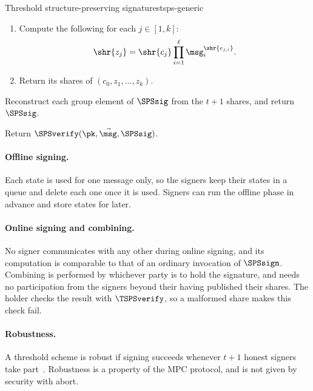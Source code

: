\begin{protocolbox}{Threshold structure-preserving signatures}{tsps-generic}
\begin{description}
      \begin{enumerate}

	\item Compute the following for each $j \in [1,k]$:
	  \begin{equation*}
	    \shr{z_j} = \shr{c_j} \prod_{i=1}^{\ell} \msg_i^{\shr{e_{j,i}}}.
	  \end{equation*}

	\item Return its shares of $(c_0, z_1, \ldots, z_k)$.

      \end{enumerate}

    \item[$\SPSsig \leftarrow \TSPScombine(\{\SPSsig_h\}_{h \in Q})$ :]
Reconstruct each group element of $\SPSsig$ from the $t+1$ shares, and return
$\SPSsig$.

    \item[$\{0,1\} \leftarrow \TSPSverify(\pk, \vec{\msg}, \SPSsig)$ :] Return
$\SPSverify(\pk, \vec{\msg}, \SPSsig)$.

  \end{description}

\end{protocolbox}

\paragraph{Offline signing.} Each state is used for one message only,
so the signers keep their
states in a queue and delete each one once it is used. Signers can run the
offline phase in advance and store states for later.

\paragraph{Online signing and combining.} No signer communicates with any other
during online signing, and its computation is comparable to that of an ordinary
invocation of $\SPSsign$. Combining is performed by whichever party is to hold the signature, and needs no
participation from the signers beyond their having published their shares. The
holder checks the result with $\TSPSverify$, so a malformed share
makes this check fail.

\paragraph{Robustness.} A threshold scheme is robust if signing succeeds
whenever $t+1$ honest signers take part~\cite{EC:GJKR96}. Robustness is a
property of the MPC protocol, and is not given by security with abort.

